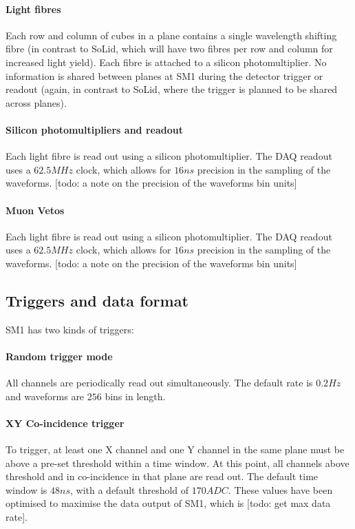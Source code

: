 {\paragraph{Light fibres}
Each row and column of cubes in a plane contains a single wavelength shifting fibre (in contrast to SoLid, which will have two fibres per row and column for increased light yield). Each fibre is attached to a silicon photomultiplier. No information is  shared between planes at SM1 during the detector trigger or readout (again, in contrast to SoLid, where the trigger is planned to be shared across planes). 

\paragraph{Silicon photomultipliers and readout}
Each light fibre is read out using a silicon photomultiplier. The DAQ readout uses a $62.5MHz$ clock, which allows for $16ns$ precision in the sampling of the waveforms. [todo: a note on the precision of the waveforms bin units]

\paragraph{Muon Vetos}
Each light fibre is read out using a silicon photomultiplier. The DAQ readout uses a $62.5MHz$ clock, which allows for $16ns$ precision in the sampling of the waveforms. [todo: a note on the precision of the waveforms bin units]

\subsection{Triggers and data format}
SM1 has two kinds of triggers:
\paragraph{Random trigger mode} All channels are periodically read out simultaneously. The default rate is $0.2Hz$ and waveforms are $256$ bins in length.
\paragraph{XY Co-incidence trigger} To trigger, at least one X channel and one Y channel in the same plane must be above a pre-set threshold within a time window. At this point, all channels above threshold and in co-incidence in that plane are read out. The default time window is $48ns$, with a default threshold of $170ADC$. These values have been optimised to maximise the data output of SM1, which is [todo: get max data rate].

}
